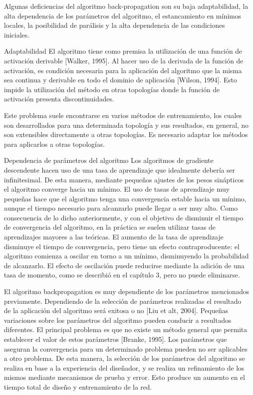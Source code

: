 \documentclass[a4paper,11pt]{article}
\newcommand{\definicion}[1]{%
	\bfseries{\textbullet #1:}
}
\newenvironment{listaDefiniciones}%
{
\begin{list}{}%
     {  \setlength{\itemsep}{0.5ex}
	\setlength{\parsep}{0.5ex}
	\setlength{\partopsep}{0.5ex}
	\setlength{\topsep}{\dimexpr 2\itemsep}
	\setlength{\listparindent}{\dimexpr \parindent}
	\renewcommand*{\makelabel}[1]{\definicion{##1}}
	}
}
{
\end{list}
}%
\begin{document}
 Algunas deficiencias del algoritmo back-propagation son su baja adaptabilidad, la alta dependencia de los par\'ametros del algoritmo, el estancamiento en m\'inimos locales, la posibilidad de par\'alisis y la alta dependencia de las condiciones iniciales.
\begin{listaDefiniciones}

 \item [Adaptabilidad] El algoritmo tiene como premisa la utilizaci\'on de una funci\'on de activaci\'on derivable [Walker, 1995]. Al hacer uso de la derivada de la funci\'on de activaci\'on, es condici\'on necesaria para la aplicaci\'on del algoritmo que la misma sea continua y derivable en todo el dominio de aplicaci\'on [Wilson, 1994]. Esto impide la utilizaci\'on del m\'etodo en otras topolog\'ias donde la funci\'on de activaci\'on presenta discontinuidades.

 Este problema suele encontrarse en varios m\'etodos de entrenamiento, los cuales son desarrollados para una determinada topolog\'ia y sus resultados, en general, no son extensibles directamente a otras topolog\'ias. Es necesario adaptar los m\'etodos para aplicarlos a otras topolog\'ias.

\item [Dependencia de par\'ametros del algoritmo] Los algoritmos de gradiente descendente hacen uso de una tasa de aprendizaje que idealmente deber\'ia ser infinitesimal. De esta manera, mediante peque\~nos ajustes de los pesos sin\'apticos el algoritmo converge hacia un m\'inimo. El uso de tasas de aprendizaje muy peque\~nas hace que el algoritmo tenga una convergencia estable hacia un m\'inimo, aunque el tiempo necesario para alcanzarlo puede llegar a ser muy alto. Como consecuencia de lo dicho anteriormente, y con el objetivo de disminuir el tiempo de convergencia del algoritmo, en la pr\'actica se suelen utilizar tasas de aprendizajes mayores a las te\'oricas. El aumento de la tasa de aprendizaje disminuye el tiempo de convergencia, pero tiene un efecto contraproducente: el algoritmo comienza a oscilar en torno a un m\'inimo, disminuyendo la probabilidad de alcanzarlo. El efecto de oscilaci\'on puede reducirse mediante la adici\'on de una tasa de momento, como se describi\'o en el cap\'itulo 3, pero no puede eliminarse.

 El algoritmo backpropagation es muy dependiente de los par\'ametros mencionados previamente. Dependiendo de la selecci\'on de par\'ametros realizadas el resultado de la aplicaci\'on del algoritmo ser\'a exitosa o no [Liu et alt, 2004]. Peque\~nas variaciones sobre los par\'ametros del algoritmo pueden conducir a resultados diferentes. El principal problema es que no existe un m\'etodo general que permita establecer el valor de estos par\'ametros [Branke, 1995]. Los par\'ametros que aseguran la convergencia para un determinado problema pueden no ser aplicables a otro problema. De esta manera, la selecci\'on de los par\'ametros del algoritmo se realiza en base a la experiencia del dise\~nador, y se realiza un refinamiento de los mismos mediante mecanismos de prueba y error. Esto produce un aumento en el tiempo total de dise\~no y entrenamiento de la red.


\end{listaDefiniciones}
\end{document}

